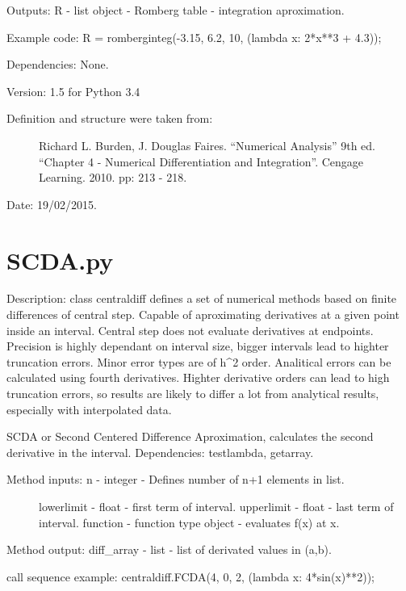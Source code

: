 \documentclass[letterpaper,10pt,oneside]{sphinxmanual}
\theoremstyle{plain}%
\theoremstyle{definition}%
\theoremstyle{remark}%
\begin{document}
Outputs: R - list object - Romberg table - integration aproximation.

Example code: R = romberginteg(-3.15, 6.2, 10, (lambda x: 2*x**3 + 4.3));

Dependencies: None.

Version: 1.5 for Python 3.4
\begin{description}
\item[{Definition and structure were taken from:}] \leavevmode
Richard L. Burden, J. Douglas Faires. ``Numerical Analysis'' 9th ed.
``Chapter 4 - Numerical Differentiation and Integration''. 
Cengage Learning. 2010. pp: 213 - 218.

\end{description}




Date: 19/02/2015.


\section{SCDA.py}
\label{code:scda-py}\label{code:module-SCDA}
Description: class centraldiff defines a set of numerical methods based on
finite differences of central step. Capable of aproximating derivatives at
a given point inside an interval. Central step does not evaluate derivatives
at endpoints. Precision is highly dependant on interval size, bigger intervals
lead to highter truncation errors. Minor error types are of h\textasciicircum{}2 order.
Analitical errors can be calculated using fourth derivatives. Highter
derivative orders can lead to high truncation errors, so results are likely
to differ a lot from analytical results, especially with interpolated data.

SCDA or Second Centered Difference Aproximation, calculates the second
derivative in the interval. Dependencies: testlambda, getarray.
\begin{description}
\item[{Method inputs: n - integer - Defines number of n+1 elements in list.}] \leavevmode
lowerlimit - float - first term of interval.
upperlimit - float - last term of interval.
function - function type object - evaluates f(x) at x.

\end{description}

Method output: diff\_array - list - list of derivated values in (a,b).

call sequence example: centraldiff.FCDA(4, 0, 2, (lambda x: 4*sin(x)**2));
\end{document}
